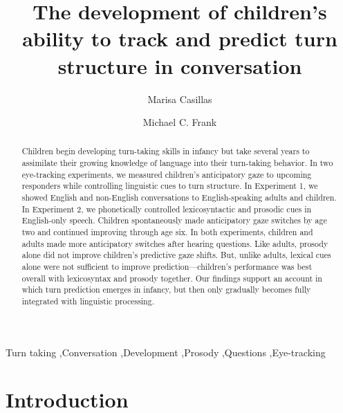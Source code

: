 \documentclass[authoryear, 12pt]{elsarticle}
\begin{document}
\begin{frontmatter}

\title{The development of children's ability to track and predict turn structure in conversation}

\author[MPI]{Marisa Casillas}
\address[MPI]{Max Planck Institute for Psycholinguistics, Nijmegen}

\author[StanfordPSY]{Michael C. Frank}

\address[StanfordPSY]{Department of Psychology, Stanford University}

\begin{abstract}
Children begin developing turn-taking skills in infancy but take several years to assimilate their growing knowledge of language into their turn-taking behavior. In two eye-tracking experiments, we measured children's anticipatory gaze to upcoming responders while controlling linguistic cues to turn structure. In Experiment 1, we showed English and non-English conversations to English-speaking adults and children. In Experiment 2, we phonetically controlled lexicosyntactic and prosodic cues in English-only speech. Children spontaneously made anticipatory gaze switches by age two and continued improving through age six. In both experiments, children and adults made more anticipatory switches after hearing questions. Like adults, prosody alone did not improve children's predictive gaze shifts. But, unlike adults, lexical cues alone were not sufficient to improve prediction---children's performance was best overall with lexicosyntax and prosody together. Our findings support an account in which turn prediction emerges in infancy, but then only gradually becomes fully integrated with linguistic processing. 
\end{abstract}

\begin{keyword}
Turn taking \sep Conversation \sep Development \sep Prosody \sep Questions \sep Eye-tracking

\end{keyword}

\end{frontmatter}

\linenumbers

\section{Introduction}
\label{sec:intro}
\end{document}
